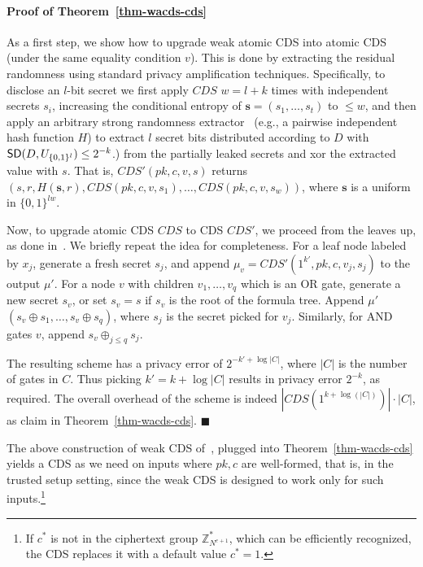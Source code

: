 \documentclass[11pt]{article}
\newcommand{\SD}{{\sf SD }}
\newcommand{\Z}{{\mathbb{Z}}}
\begin{document}
\paragraph{Proof of Theorem~\ref{thm-wacds-cds}}
As a first step, we show how to upgrade weak atomic CDS into atomic CDS (under the same equality  condition $v$). This is done by extracting the residual randomness using standard privacy amplification techniques. Specifically, to disclose an $l$-bit
secret we first apply $CDS$ $w=l+k$ times with independent
secrets $s_i$, increasing the conditional entropy of 
$\textbf{s}=(s_1,\ldots,s_t)$
to $\leq w$, and then apply an arbitrary strong randomness extractor~\cite{NZ}
(e.g., a pairwise independent hash function $H$\cite{BBR,ILL,BBCM}) to
extract $l$ secret bits  distributed according to $D$ with $\SD(D,U_{\{0,1\}^l})\leq 2^{-k}$.)
from the partially leaked secrets and xor the extracted value with $s$. That is, $CDS'(pk,c,v,s)$ returns $(s,r,H(\textbf{s},r),CDS(pk,c,v,s_1),\ldots,CDS(pk,c,v,s_w))$,
where $\textbf{s}$ is a uniform in $\{0,1\}^{lw}$.

Now, to upgrade atomic CDS $CDS$ to CDS $CDS'$, we proceed from the leaves up, as done in~\cite{AIR01}. We briefly repeat the idea for completeness.
For a leaf node labeled by $x_j$, generate a fresh secret $s_j$, and 
append $\mu_v=CDS'(1^{k'}, pk,c,v_j,s_j)$ to the output $\mu'$. For a node $v$ with children $v_1,\ldots,v_q$ which is an OR gate, generate a new secret $s_v$,
or set $s_v=s$ if $s_v$ is the root of the formula tree.
Append $\mu'$ $(s_v\oplus s_1,\ldots,s_v\oplus s_q)$, where $s_j$ is the secret picked for $v_j$. Similarly, for AND gates $v$, append
$s_v\oplus_{j\leq q}s_j$. 

The resulting scheme has a privacy error of $2^{-k'+\log{|C|}}$, where $|C|$ is the number of gates in $C$. Thus picking $k'=k+\log{|C|}$ results in privacy error $2^{-k}$, as required. The overall overhead of the scheme is indeed $|CDS(1^{k+\log(|C|)})|\cdot |C|$, as claim in Theorem~\ref{thm-wacds-cds}.\;\;\; $\blacksquare$


The above construction of weak CDS of~\cite{AIR01}, plugged into Theorem~\ref{thm-wacds-cds} yields a CDS as we need on inputs where $pk,c$ are well-formed, that is, in the trusted setup setting, since the weak CDS is designed to work only for such inputs.\footnote{If $c^*$ is not in the ciphertext group $\Z^*_{N^{e+1}}$, which can be efficiently recognized, the CDS replaces it with a default value $c^*=1$.}
\end{document}
